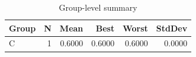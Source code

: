 \begin{table}[htbp]
\centering
\caption{Group-level summary}
\label{tab:group-summary}
\begin{tabular}{lrrrrr}
\toprule
\textbf{Group} & \textbf{N} & \textbf{Mean} & \textbf{Best} & \textbf{Worst} & \textbf{StdDev} \\
\midrule
C & 1 & 0.6000 & 0.6000 & 0.6000 & 0.0000 \\
\bottomrule
\end{tabular}
\end{table}